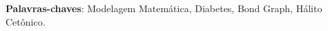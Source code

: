 \begin{resumo}
 \vspace{\onelineskip}
    
 \noindent
 \textbf{Palavras-chaves}: Modelagem Matemática, Diabetes, Bond Graph, Hálito Cetônico.
\end{resumo}
